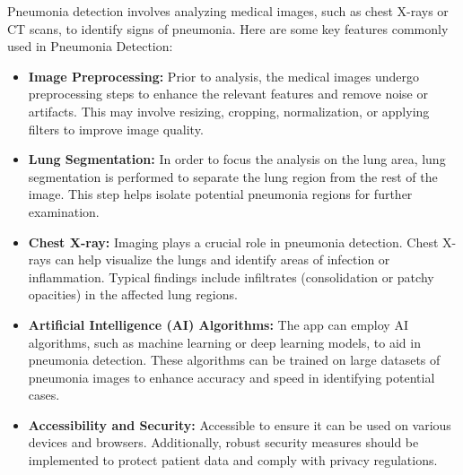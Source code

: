 Pneumonia detection involves analyzing medical images, such as chest X-rays or CT scans, to identify signs of pneumonia. Here are some key features commonly used in Pneumonia Detection:
\begin{itemize}
	\item \textbf{Image Preprocessing:} Prior to analysis, the medical images undergo preprocessing steps to enhance the relevant features and remove noise or artifacts. This may involve resizing, cropping, normalization, or applying filters to improve image quality.
	
	\item \textbf{Lung Segmentation:} In order to focus the analysis on the lung area, lung segmentation is performed to separate the lung region from the rest of the image. This step helps isolate potential pneumonia regions for further examination.
	
	\item \textbf{Chest X-ray:} Imaging plays a crucial role in pneumonia detection. Chest X-rays can help visualize the lungs and identify areas of infection or inflammation. Typical findings include infiltrates (consolidation or patchy opacities) in the affected lung regions.
	
	\item \textbf{Artificial Intelligence (AI) Algorithms:} The app can employ AI algorithms, such as machine learning or deep learning models, to aid in pneumonia detection. These algorithms can be trained on large datasets of pneumonia images to enhance accuracy and speed in identifying potential cases.
	
	\item \textbf{Accessibility and Security:} Accessible to ensure it can be used on various devices and browsers. Additionally, robust security measures should be implemented to protect patient data and comply with privacy regulations.
	

\end{itemize}

